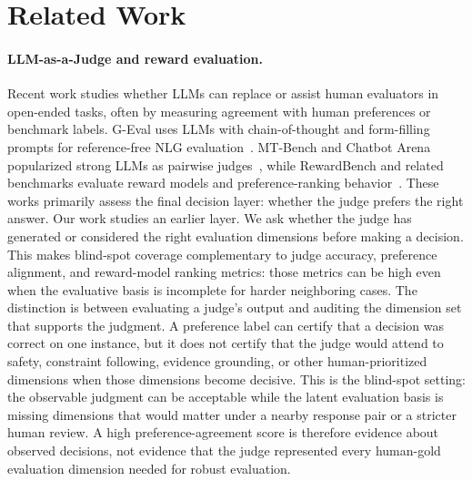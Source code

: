 \section{Related Work}

\paragraph{LLM-as-a-Judge and reward evaluation.}
Recent work studies whether LLMs can replace or assist human evaluators in
open-ended tasks, often by measuring agreement with human preferences or
benchmark labels. G-Eval uses LLMs with chain-of-thought and form-filling
prompts for reference-free NLG evaluation~\cite{liu2023geval}. MT-Bench and
Chatbot Arena popularized strong LLMs as pairwise
judges~\cite{zheng2023judging}, while RewardBench and related
benchmarks evaluate reward models and preference-ranking
behavior~\cite{lambert2024rewardbench}. These works primarily assess the final
decision layer: whether the judge prefers the right answer. Our work studies
an earlier layer. We ask whether the judge has generated or considered the
right evaluation dimensions before making a decision. This makes blind-spot
coverage complementary to judge accuracy, preference alignment, and
reward-model ranking metrics: those metrics can be high even when the
evaluative basis is incomplete for harder neighboring cases.
The distinction is between evaluating a judge's output and auditing the
dimension set that supports the judgment. A preference label can certify that a
decision was correct on one instance, but it does not certify that the judge
would attend to safety, constraint following, evidence grounding, or other
human-prioritized dimensions when those dimensions become decisive.
This is the blind-spot setting: the observable judgment can be acceptable while
the latent evaluation basis is missing dimensions that would matter under a
nearby response pair or a stricter human review.
A high preference-agreement score is therefore evidence about observed
decisions, not evidence that the judge represented every human-gold evaluation
dimension needed for robust evaluation.

